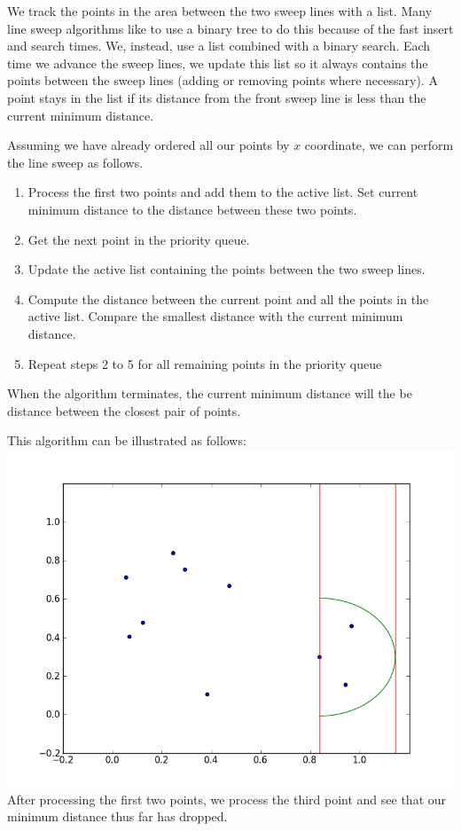 We track the points in the area between the two sweep lines with a list.  Many line sweep algorithms like to use a binary tree
to do this because of the fast insert and search times.  We, instead, use a list combined with a binary search.  Each time we advance
the sweep lines, we update this list so it always contains the points between the sweep lines (adding or removing points where necessary).
A point stays in the list if its distance from the front sweep line is less than the current minimum distance.

Assuming we have already ordered all our points by $x$ coordinate, we can perform the line sweep as follows.
\begin{enumerate}
\item Process the first two points and add them to the active list.
Set current minimum distance to the distance between these two points.
\item Get the next point in the priority queue.
\item Update the active list containing the points between the two sweep lines.
\item Compute the distance between the current point and all the points in the active list.
Compare the smallest distance with the current minimum distance.
\item Repeat steps 2 to 5 for all remaining points in the priority queue
\end{enumerate}
When the algorithm terminates, the current minimum distance will the be distance between the closest pair of points.

This algorithm can be illustrated as follows:
\includegraphics[width = \textwidth]{simple1.png}
After processing the first two points, we process the third point and see that our minimum distance thus far has dropped.

